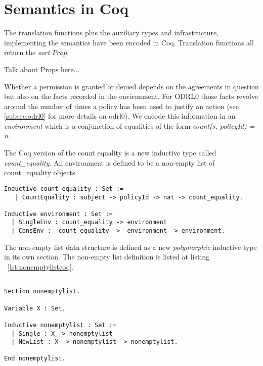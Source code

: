 \section{Semantics in Coq}
\label{sec:Semanticsincoq}

The translation functions plus the auxiliary types and infrastructure, implementing the semantics have been encoded in Coq. Translation functions all return the \emph{sort} $Prop$. 

Talk about Props here...


Whether a permission is granted or denied depends on the agreements in question but also on the facts recorded in the environment. For ODRL0 those facts revolve around the number of times a policy has been used to justify an action (see \ref{subsec:odrl0} for more details on odrl0). We encode this information in an \emph{environment} which is a conjunction of equalities of the form \emph{count(s, policyId) = n}. 

The Coq version of the count equality is a new inductive type called \emph{count_equality}. An environment is defined to be a non-empty list of count_equality objects.

\begin{minipage}[c]{0.95\textwidth}
\begin{lstlisting}
Inductive count_equality : Set := 
   | CountEquality : subject -> policyId -> nat -> count_equality.

Inductive environment : Set := 
  | SingleEnv : count_equality -> environment
  | ConsEnv :  count_equality ->  environment -> environment.

\end{lstlisting}
\end{minipage}

The non-empty list data structure is defined as a new \emph{polymorphic} inductive type in its own section. The non-empty list definition is listed at listing ~\ref{lst:nonemptylistcoq}.

\begin{lstlisting}

Section nonemptylist.

Variable X : Set.

Inductive nonemptylist : Set :=
  | Single : X -> nonemptylist 
  | NewList : X -> nonemptylist -> nonemptylist.

End nonemptylist.
\end{lstlisting}

